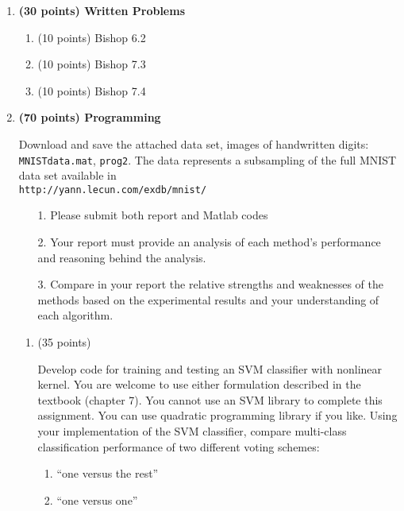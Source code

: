 \documentclass[12pt]{report}
\begin{document}
\begin{enumerate}[leftmargin=.2in]

\item \textbf{(30 points) Written Problems}
\begin{enumerate}[leftmargin=.1in] %
\item (10 points) Bishop 6.2
\item (10 points) Bishop 7.3
\item (10 points) Bishop 7.4
\end{enumerate}

  \item \textbf{(70 points) Programming}


Download and save the attached data set, images of handwritten digits: {\texttt{MNISTdata.mat}}, {\texttt{prog2}}. The data represents a subsampling of the full MNIST data set available in \\ {\texttt{http://yann.lecun.com/exdb/mnist/}}


\begin{enumerate}
\item[1.] Please submit both report and Matlab codes
\item[2.] Your report must provide an analysis of each method’s performance and reasoning behind the analysis.
\item[3.]Compare in your report the relative strengths and weaknesses of the methods based on the experimental results and your understanding of each algorithm.
\end{enumerate}

\begin {enumerate}

 \item (35 points)

Develop code for training and testing an SVM classifier with nonlinear kernel. You are welcome to use either formulation described in the textbook (chapter 7). You cannot use an SVM library to complete this assignment. You can use quadratic programming library if you like. Using your implementation of the SVM classifier, compare multi-class classification performance of two different voting schemes:


\begin{enumerate}
\item “one versus the rest”
\item “one versus one”
\end{enumerate}


\end{enumerate}
\end{enumerate}
\end{document}
